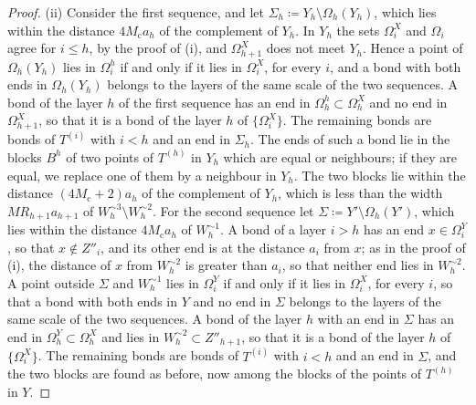 \documentclass[11pt]{preprint}
\numberwithin{equation}{section}
\begin{document}
\begin{proof}
(ii) Consider the first sequence, and let $\Sigma_h \coloneqq Y_h \setminus \Omega_h(Y_h)$, which lies within the distance $4M_{\mathrm c}a_h$ of the complement of $Y_h$. In $Y_h$ the sets $\Omega^X_i$ and $\Omega_i$ agree for $i \leqslant h$, by the proof of (i), and $\Omega^X_{h+1}$ does not meet $Y_h$. Hence a point of $\Omega_h(Y_h)$ lies in $\Omega^h_i$ if and only if it lies in $\Omega^X_i$, for every $i$, and a bond with both ends in $\Omega_h(Y_h)$ belongs to the layers of the same scale of the two sequences. A bond of the layer $h$ of the first sequence has an end in $\Omega^h_h \subset \Omega^X_h$ and no end in $\Omega^X_{h+1}$, so that it is a bond of the layer $h$ of $\{ \Omega^X_i \}$. The remaining bonds are bonds of $T^{(i)}$ with $i < h$ and an end in $\Sigma_h$. The ends of such a bond lie in the blocks $B^h$ of two points of $T^{(h)}$ in $Y_h$ which are equal or neighbours; if they are equal, we replace one of them by a neighbour in $Y_h$. The two blocks lie within the distance $(4M_{\mathrm c} + 2)a_h$ of the complement of $Y_h$, which is less than the width $MR_{h+1}a_{h+1}$ of $W_h^{\sim3} \setminus W_h^{\sim2}$. For the second sequence let $\Sigma \coloneqq Y' \setminus \Omega_h(Y')$, which lies within the distance $4M_{\mathrm c}a_h$ of $W_h^{\sim1}$. A bond of a layer $i > h$ has an end $x \in \Omega^Y_i$, so that $x \notin Z''_i$, and its other end is at the distance $a_i$ from $x$; as in the proof of (i), the distance of $x$ from $W_h^{\sim2}$ is greater than $a_i$, so that neither end lies in $W_h^{\sim2}$. A point outside $\Sigma$ and $W_h^{\sim1}$ lies in $\Omega^Y_i$ if and only if it lies in $\Omega^X_i$, for every $i$, so that a bond with both ends in $Y$ and no end in $\Sigma$ belongs to the layers of the same scale of the two sequences. A bond of the layer $h$ with an end in $\Sigma$ has an end in $\Omega^Y_h \subset \Omega^X_h$ and lies in $W_h^{\sim2} \subset Z''_{h+1}$, so that it is a bond of the layer $h$ of $\{ \Omega^X_i \}$. The remaining bonds are bonds of $T^{(i)}$ with $i < h$ and an end in $\Sigma$, and the two blocks are found as before, now among the blocks of the points of $T^{(h)}$ in $Y$.


\end{proof}
\end{document}

